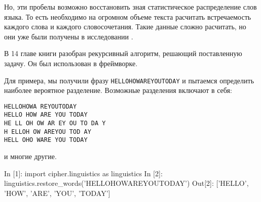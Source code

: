 Но, эти пробелы возможно восстановить зная статистическое распределение
слов языка.
То есть необходимо на огромном объеме текста расчитать встречаемость
каждого слова и каждого словосочетания.
Такие данные сложно расчитать, но они уже были получены
в исследовании \cite{google-ngrams}.

В 14 главе книги \cite{segaran-data} разобран рекурсивный 
алгоритм, решающий поставленную задачу. Он был использован в 
фреймворке.

Для примера, мы получили фразу \texttt{HELLOHOWAREYOUTODAY} и пытаемся 
определить наиболее вероятное разделение. Возможные разделения 
включают в себя:

\begin{verbatim}
HELLOHOWA REYOUTODAY
HELLO HOW ARE YOU TODAY
HE LL OH OW AR EY OU TO DA Y
H ELLOH OW AREYOU TOD AY
HELL OHO WARE YOU TODAY
\end{verbatim}

и многие другие.

\begin{listing}[1]{1}
In [1]: import cipher.linguistics as linguistics
In [2]: linguistics.restore_words('HELLOHOWAREYOUTODAY')
Out[2]: ['HELLO', 'HOW', 'ARE', 'YOU', 'TODAY']
\end{listing}
